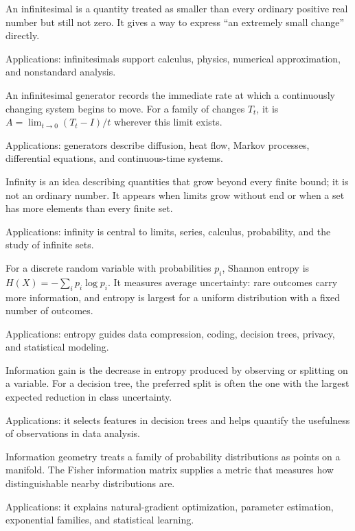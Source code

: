 An infinitesimal is a quantity treated as smaller than every ordinary positive real number but still not zero. It gives a way to express “an extremely small change” directly. \par\noindent Applications: infinitesimals support calculus, physics, numerical approximation, and nonstandard analysis.

An infinitesimal generator records the immediate rate at which a continuously changing system begins to move. For a family of changes $T_t$, it is $A=\lim_{t\to0}(T_t-I)/t$ wherever this limit exists. \par\noindent Applications: generators describe diffusion, heat flow, Markov processes, differential equations, and continuous-time systems.

Infinity is an idea describing quantities that grow beyond every finite bound; it is not an ordinary number. It appears when limits grow without end or when a set has more elements than every finite set. \par\noindent Applications: infinity is central to limits, series, calculus, probability, and the study of infinite sets.

For a discrete random variable with probabilities $p_i$, Shannon entropy is $H(X)=-\sum_i p_i\log p_i$. It measures average uncertainty: rare outcomes carry more information, and entropy is largest for a uniform distribution with a fixed number of outcomes. \par\noindent Applications: entropy guides data compression, coding, decision trees, privacy, and statistical modeling.

Information gain is the decrease in entropy produced by observing or splitting on a variable. For a decision tree, the preferred split is often the one with the largest expected reduction in class uncertainty. \par\noindent Applications: it selects features in decision trees and helps quantify the usefulness of observations in data analysis.

Information geometry treats a family of probability distributions as points on a manifold. The Fisher information matrix supplies a metric that measures how distinguishable nearby distributions are. \par\noindent Applications: it explains natural-gradient optimization, parameter estimation, exponential families, and statistical learning.

